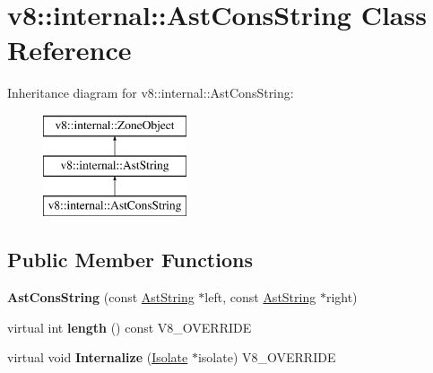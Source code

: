 \hypertarget{classv8_1_1internal_1_1_ast_cons_string}{}\section{v8\+:\+:internal\+:\+:Ast\+Cons\+String Class Reference}
\label{classv8_1_1internal_1_1_ast_cons_string}
Inheritance diagram for v8\+:\+:internal\+:\+:Ast\+Cons\+String\+:\begin{figure}[H]
\begin{center}
\leavevmode
\includegraphics[height=3.000000cm]{classv8_1_1internal_1_1_ast_cons_string}
\end{center}
\end{figure}
\subsection*{Public Member Functions}
\begin{DoxyCompactItemize}
\item 
\hypertarget{classv8_1_1internal_1_1_ast_cons_string_a63b072d83d50c6bfe1e7d3ae7720856b}{}{\bfseries Ast\+Cons\+String} (const \hyperlink{classv8_1_1internal_1_1_ast_string}{Ast\+String} $\ast$left, const \hyperlink{classv8_1_1internal_1_1_ast_string}{Ast\+String} $\ast$right)\label{classv8_1_1internal_1_1_ast_cons_string_a63b072d83d50c6bfe1e7d3ae7720856b}

\item 
\hypertarget{classv8_1_1internal_1_1_ast_cons_string_abb376ec996cb33221fd44d218984dfa6}{}virtual int {\bfseries length} () const V8\+\_\+\+O\+V\+E\+R\+R\+I\+D\+E\label{classv8_1_1internal_1_1_ast_cons_string_abb376ec996cb33221fd44d218984dfa6}

\item 
\hypertarget{classv8_1_1internal_1_1_ast_cons_string_a77fa23320ebc0d09e0f9e021dfd5fdc7}{}virtual void {\bfseries Internalize} (\hyperlink{classv8_1_1internal_1_1_isolate}{Isolate} $\ast$isolate) V8\+\_\+\+O\+V\+E\+R\+R\+I\+D\+E\label{classv8_1_1internal_1_1_ast_cons_string_a77fa23320ebc0d09e0f9e021dfd5fdc7}

\end{DoxyCompactItemize}
